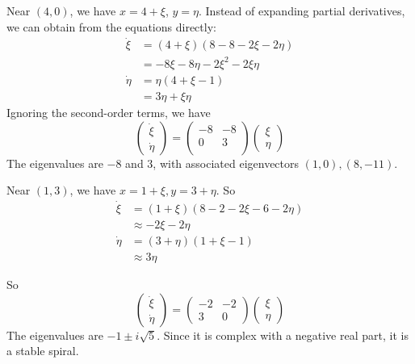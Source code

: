 \documentclass[a4paper]{article}
\begin{document}
\begin{eg}
Near $(4, 0)$, we have $x = 4 + \xi$, $y = \eta$. Instead of expanding partial derivatives, we can obtain from the equations directly:
\begin{align*}
  \dot\xi &= (4 + \xi)(8 - 8 - 2\xi - 2\eta)\\
  &= - 8\xi - 8\eta -2\xi^2 - 2\xi\eta\\
  \dot\eta &= \eta(4 + \xi - 1)\\
  &= 3\eta + \xi\eta
\end{align*}
Ignoring the second-order terms, we have
\[
\begin{pmatrix}
\dot\xi\\\dot\eta
\end{pmatrix} = 
\begin{pmatrix}
  -8 & -8 \\
  0 & 3\\
\end{pmatrix}
\begin{pmatrix}
  \xi\\\eta
\end{pmatrix}
\]
The eigenvalues are $-8$ and $3$, with associated eigenvectors $(1, 0), (8, -11)$.

\begin{center}
\end{center}

Near $(1, 3)$, we have $x = 1 + \xi, y = 3 + \eta$. So
\begin{align*}
  \dot \xi &= (1 + \xi)(8 - 2 - 2\xi - 6 - 2\eta)\\
  &\approx -2\xi - 2\eta\\
  \dot\eta &= (3 + \eta)(1 + \xi - 1)\\
  &\approx 3\eta
\end{align*}

So
\[
\begin{pmatrix}
  \dot\xi\\\dot\eta
\end{pmatrix} = 
\begin{pmatrix}
  -2 & -2\\
  3 & 0
\end{pmatrix}
\begin{pmatrix}
  \xi\\\eta
\end{pmatrix}
\]
The eigenvalues are $- 1\pm i\sqrt{5}$. Since it is complex with a negative real part, it is a stable spiral.


\end{eg}
\end{document}
